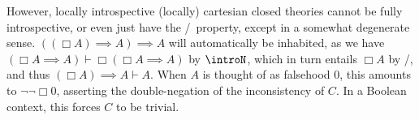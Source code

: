 \begin{observation}

However, locally introspective (locally) cartesian closed theories cannot be fully introspective, or even just have the \Loeb/\ property, except in a somewhat degenerate sense. $((\Box A) \implies A) \implies A$ will automatically be inhabited, as we have $(\Box A \implies A) \vdash \Box (\Box A \implies A)$ by $\introN$, which in turn entails $\Box A$ by \Loeb/, and thus $(\Box A) \implies A \vdash A$. When $A$ is thought of as falsehood $0$, this amounts to $\neg \neg \Box 0$, asserting the double-negation of the inconsistency of $C$. In a Boolean context, this forces $C$ to be trivial.

\end{observation}
\fileend